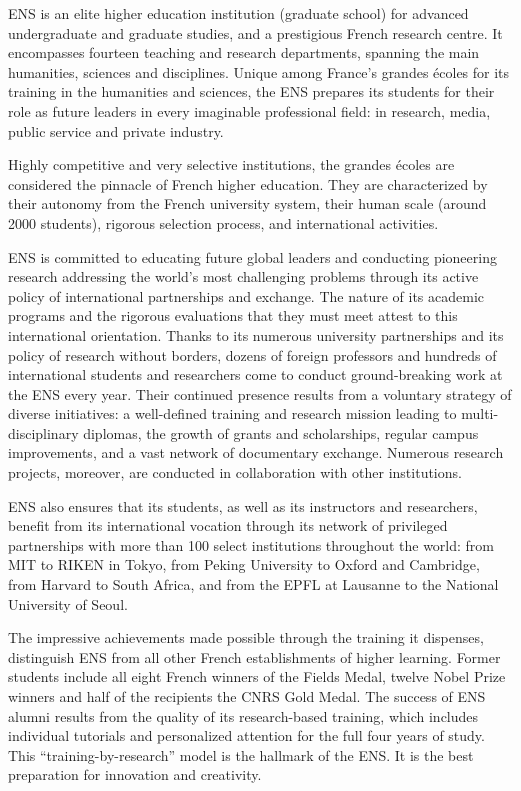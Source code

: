 \documentclass[12pt]{article}
\begin{document}
ENS is an elite higher
education institution (graduate school) for advanced undergraduate and graduate
studies, and a prestigious French research centre. It encompasses fourteen
teaching and research departments, spanning the main humanities, sciences and
disciplines. Unique among France's grandes \'ecoles for its training in the
humanities and sciences, the ENS prepares its students for their role as future
leaders in every imaginable professional field: in research, media, public
service and private industry.

Highly competitive and very selective institutions, the grandes \'ecoles are
considered the pinnacle of French higher education. They are characterized by
their autonomy from the French university system, their human scale (around 2000
students), rigorous selection process, and international activities.

ENS is committed to educating
future global leaders and conducting pioneering research addressing the world's
most challenging problems through its active policy of international
partnerships and exchange. The nature of its academic programs and the rigorous
evaluations that they must meet attest to this international orientation.
Thanks to its numerous university partnerships and its policy of research
without borders, dozens of foreign professors and hundreds of international
students and researchers come to conduct ground-breaking work at the ENS
 every year. Their continued presence results from a
voluntary strategy of diverse initiatives: a well-defined training and research
mission leading to multi-disciplinary diplomas, the growth of grants and
scholarships, regular campus improvements, and a vast network of documentary
exchange. Numerous research projects, moreover, are conducted in collaboration
with other institutions.

ENS also ensures that its students, as well as its
instructors and researchers, benefit from its international vocation through its
network of privileged partnerships with more than 100 select institutions
throughout the world: from MIT to RIKEN in Tokyo, from Peking University to
Oxford and Cambridge, from Harvard to South Africa, and from the
EPFL at Lausanne to the National University of Seoul.

The impressive achievements made possible
through the training it dispenses, distinguish ENS
from all other French establishments of higher learning. Former students include
all eight French winners of the Fields Medal, twelve Nobel Prize winners and
half of the recipients the CNRS Gold Medal.
The success of ENS alumni results from the quality of its research-based
training, which includes individual tutorials and personalized attention for the
full four years of study. This ``training-by-research'' model is the hallmark of
the ENS. It is the best preparation for innovation and
creativity.
\end{document}
